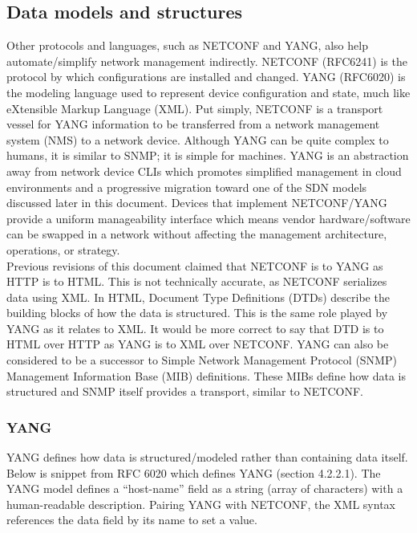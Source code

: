 \subsection{Data models and structures}
Other protocols and languages, such as NETCONF and YANG, also help
automate/simplify network management indirectly. NETCONF (RFC6241) is the
protocol by which configurations are installed and changed. YANG (RFC6020) is
the modeling language used to represent device configuration and state, much
like eXtensible Markup Language (XML). Put simply, NETCONF is a transport
vessel for YANG information to be transferred from a network management system
(NMS) to a network device. Although YANG can be quite complex to humans, it is
similar to SNMP\@; it is simple for machines. YANG is an abstraction away from
network device CLIs which promotes simplified management in cloud environments
and a progressive migration toward one of the SDN models discussed later in
this document. Devices that implement NETCONF/YANG provide a uniform
manageability interface which means vendor hardware/software can be swapped in
a network without affecting the management architecture, operations, or strategy. \\

Previous revisions of this document claimed that NETCONF is to YANG as HTTP is
to HTML\@. This is not technically accurate, as NETCONF serializes data using
XML\@. In HTML, Document Type Definitions (DTDs) describe the building blocks of
how the data is structured. This is the same role played by YANG as it relates
to XML\@. It would be more correct to say that DTD is to HTML over HTTP as YANG
is to XML over NETCONF\@. YANG can also be considered to be a successor to
Simple Network Management Protocol (SNMP) Management Information Base (MIB)
definitions. These MIBs define how data is structured and SNMP itself provides
a transport, similar to NETCONF\@.

\subsubsection{YANG}
YANG defines how data is structured/modeled rather than containing data
itself. Below is snippet from RFC 6020 which defines YANG (section 4.2.2.1).
The YANG model defines a ``host-name'' field as a string (array of characters)
with a human-readable description. Pairing YANG with NETCONF, the XML syntax
references the data field by its name to set a value. \\

